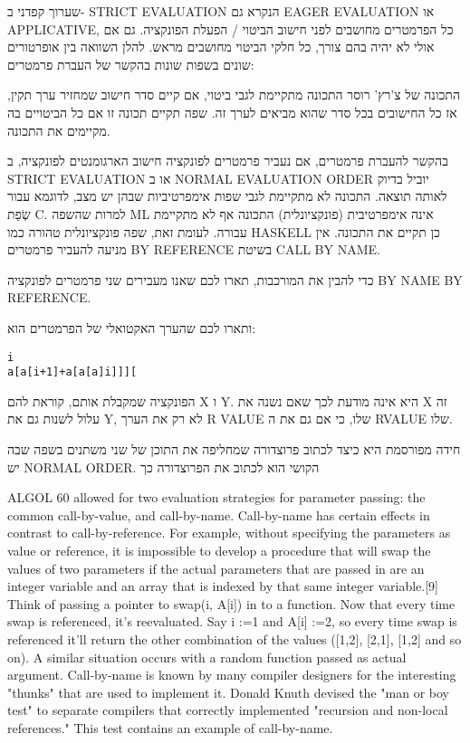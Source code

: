 \begin{טבלא}[!htbp]
        שערוך קפדני
        ב- STRICT EVALUATION הנקרא גם EAGER EVALUATION או APPLICATIVE, כל הפרמטרים מחושבים לפני חישוב הביטוי / הפעלת הפונקציה. גם אם אולי לא יהיה בהם צורך, כל חלקי הביטוי מחושבים מראש.
        להלן השוואה בין אופרטורים שונים בשפות שונות בהקשר של העברת פרמטרים:

        התכונה של צ'רץ' רוסר
        התכונה מתקיימת לגבי ביטוי, אם קיים סדר חישוב שמחזיר ערך תקין, אז כל החישובים
        בכל סדר שהוא מביאים לערך זה. שפה תקיים תכונה זו אם כל הביטויים בה מקיימים את
        התכונה.

        בהקשר להעברת פרמטרים, אם נעביר פרמטרים לפונקציה חישוב הארגומנטים לפונקציה, ב
        STRICT EVALUATION או ב NORMAL EVALUATION ORDER יוביל בדיוק לאותה תוצאה. התכונה
        לא מתקיימת לגבי שפות אימפרטיביות שבהן יש מצב, לדוגמא עבור שְׂפַת C. למרות שהשפה
        ML אינה אימפרטיבית (פונקציונלית) התכונה אף לא מתקיימת עבורה. לעומת זאת, שפה
        פונקציונלית טהורה כמו HASKELL כן תקיים את התכונה. אין מניעה להעביר פרמטרים BY
        REFERENCE בשיטת CALL BY NAME.

        כדי להבין את המורכבות, תארו לכם שאנו מעבירים שני פרמטרים לפונקציה BY NAME BY
        REFERENCE.

        ותארו לכם שהערך האקטואלי של הפרמטרים הוא:

\begin{verbatim}
i
a[a[i+1]+a[a[a]i]]][
\end{verbatim}

        הפונקציה שמקבלת אותם, קוראת להם X ו Y. היא אינה מודעת לכך שאם נשנה את X זה עלול לשנות גם את Y, לא רק את הערך R VALUE שלו, כי אם גם את ה RVALUE שלו.

        חידה מפורסמת היא כיצד לכתוב פרוצדורה שמחליפה את התוכן של שני משתנים בשפה שבה יש NORMAL ORDER. הקושי הוא לכתוב את הפרוצדורה כך

        ALGOL 60 allowed for two evaluation strategies for parameter passing: the common call-by-value, and call-by-name. Call-by-name has certain effects in contrast to call-by-reference. For example, without specifying the parameters as value or reference, it is impossible to develop a procedure that will swap the values of two parameters if the actual parameters that are passed in are an integer variable and an array that is indexed by that same integer variable.[9] Think of passing a pointer to swap(i, A[i]) in to a function. Now that every time swap is referenced, it's reevaluated. Say i :=1 and A[i] :=2, so every time swap is referenced it'll return the other combination of the values ([1,2], [2,1], [1,2] and so on). A similar situation occurs with a random function passed as actual argument.
        Call-by-name is known by many compiler designers for the interesting "thunks" that are used to implement it. Donald Knuth devised the "man or boy test" to separate compilers that correctly implemented "recursion and non-local references." This test contains an example of call-by-name.


\end{טבלא}
